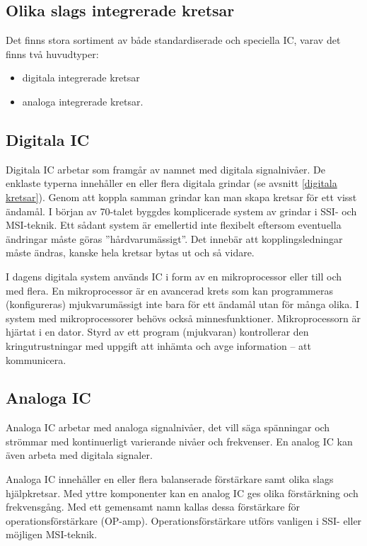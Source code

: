 \subsection{Olika slags integrerade kretsar}

Det finns stora sortiment av både standardiserade och speciella IC, varav det finns två huvudtyper:
\begin{itemize}
  \item digitala integrerade kretsar
  \item analoga integrerade kretsar.
\end{itemize}

\subsection{Digitala IC}

Digitala IC arbetar som framgår av namnet med digitala signalnivåer. De enklaste typerna innehåller en eller flera digitala grindar (se avsnitt \ref{digitala kretsar}).
Genom att koppla samman grindar kan man skapa kretsar för ett visst ändamål.
I början av 70-talet byggdes komplicerade system av grindar i SSI- och MSI-teknik.
Ett sådant system är emellertid inte flexibelt eftersom eventuella ändringar måste göras ''hårdvarumässigt''.
Det innebär att kopplingsledningar måste ändras, kanske hela kretsar bytas ut och så vidare.

I dagens digitala system används IC i form av en mikroprocessor eller till och
med flera.
En mikroprocessor är en avancerad krets som kan programmeras (konfigureras) mjukvarumässigt inte bara för ett ändamål utan för många olika. I system med mikroprocessorer behövs också minnesfunktioner. Mikroprocessorn är hjärtat i en dator. Styrd av ett program (mjukvaran) kontrollerar den kringutrustningar med uppgift att inhämta och avge information -- att kommunicera.

\subsection{Analoga IC}

Analoga IC arbetar med analoga signalnivåer, det vill säga spänningar och strömmar med
kontinuerligt varierande nivåer och frekvenser. En analog IC kan även arbeta med digitala signaler.

Analoga IC innehåller en eller flera balanserade förstärkare samt olika slags hjälpkretsar. Med yttre komponenter kan en analog IC ges olika förstärkning och frekvensgång. Med ett gemensamt namn kallas dessa förstärkare för operationsförstärkare (OP-amp). Operationsförstärkare utförs vanligen i SSI- eller möjligen MSI-teknik.

